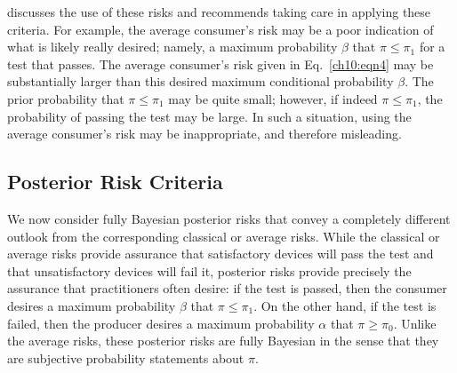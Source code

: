 \documentclass {book}
\begin{document}
\citet{MW82} discusses the use of these risks and recommends
taking care in applying these criteria. For example, the average
consumer's risk may be a poor indication of what is likely really
desired; namely, a maximum probability $\beta$ that $\pi\leq\pi_1$
for a test that passes. The average consumer's risk given in
Eq.~\ref{ch10:eqn4} may be substantially larger than this desired
maximum conditional probability $\beta$. The prior probability
that $\pi \leq \pi_1$ may be quite small; however, if indeed $\pi
\leq \pi_1$, the probability of passing the test may be large. In
such a situation, using the average consumer's risk may be
inappropriate, and therefore misleading. 

\subsection{Posterior Risk
Criteria}\label{ch10:sec1:ss3} We now
consider fully Bayesian posterior risks that convey a completely
different outlook from the corresponding classical or average
risks. While the classical or average
risks provide assurance that satisfactory
devices will pass the test and that unsatisfactory devices will
fail it, posterior risks provide precisely the assurance that
practitioners often desire: if the test is passed, then the
consumer desires a maximum probability $\beta$ that $\pi \leq
\pi_1$. On the other hand, if the test is failed, then the
producer desires a maximum probability $\alpha$ that $\pi \geq
\pi_0$. Unlike the average risks, these posterior risks are fully
Bayesian in the sense that they are subjective probability
statements about $\pi$.
\end{document}
